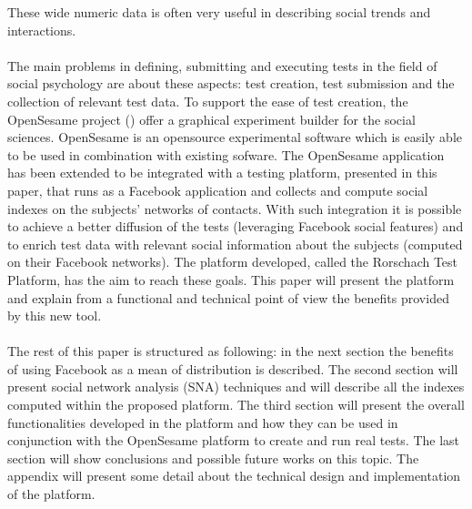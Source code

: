 These wide numeric data is often very useful in describing social trends and interactions.\\
\\
The main problems in defining, submitting and executing tests in the field of social psychology are about these aspects: test creation, test submission and the collection
of relevant test data.
To support the ease of test creation, the OpenSesame project (\cite{Matot-2011}) offer a graphical experiment builder for the social sciences.
OpenSesame is an opensource experimental software which is easily able to be used in combination with existing sofware.
The OpenSesame application has been extended to be integrated with a testing platform, presented in this paper, that runs as a Facebook application and collects and compute
social indexes on the subjects' networks of contacts.
With such integration it is possible to achieve a better diffusion of the tests (leveraging Facebook social features) and to enrich test data with relevant social
information about the subjects (computed on their Facebook networks).
The platform developed, called the Rorschach Test Platform, has the aim to reach these goals.
This paper will present the platform and explain from a functional and technical point of view the benefits provided by this new tool.\\
\\
The rest of this paper is structured as following: in the next section the benefits of using Facebook as a mean of distribution is described.
The second section will present social network analysis (SNA) techniques and will describe all the indexes computed within the proposed platform.
The third section will present the overall functionalities developed in the platform and how they can be used in conjunction with the OpenSesame platform to create
and run real tests.
The last section will show conclusions and possible future works on this topic.
The appendix will present some detail about the technical design and implementation of the platform.

\label{sec:leveraginfacebook}

